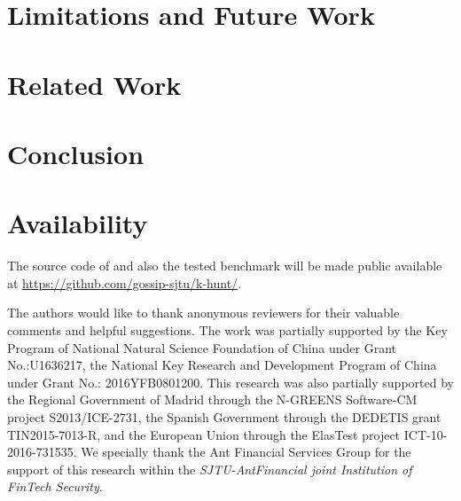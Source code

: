 \documentclass[sigconf]{acmart}
\begin{document}
\section{Limitations and Future Work}
\label{sec:discussion}



\section{Related Work}
\label{sec:related}


\section{Conclusion}
\label{sec:conclusion}


\section{Availability}
The source code of \sysname and also the tested benchmark will be made public available at \url{https://github.com/gossip-sjtu/k-hunt/}.

\begin{acks}
The authors would like to thank anonymous reviewers for their valuable comments and helpful suggestions. 
The work was partially supported by the Key Program of National Natural Science Foundation of China under Grant No.:U1636217,
	the National Key Research and Development Program of China under Grant No.: 2016YFB0801200.
This research was also partially supported by the Regional Government of Madrid through the N-GREENS Software-CM project S2013/ICE-2731, the Spanish Government through the DEDETIS grant TIN2015-7013-R, and the European Union through the ElasTest project ICT-10-2016-731535.
We specially thank the Ant Financial Services Group for the support of this research within the \emph{SJTU-AntFinancial joint Institution of FinTech Security}.
\end{acks}



\end{document}
